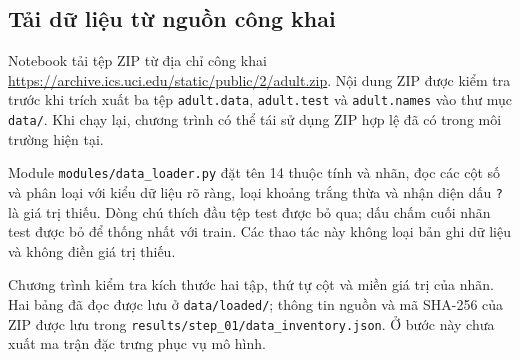 \subsection{Tải dữ liệu từ nguồn công khai}
\label{subsec:4_2_1}
Notebook tải tệp ZIP từ địa chỉ công khai \url{https://archive.ics.uci.edu/static/public/2/adult.zip}. Nội dung ZIP được kiểm tra trước khi trích xuất ba tệp \texttt{adult.data}, \texttt{adult.test} và \texttt{adult.names} vào thư mục \texttt{data/}. Khi chạy lại, chương trình có thể tái sử dụng ZIP hợp lệ đã có trong môi trường hiện tại.

Module \texttt{modules/data\_loader.py} đặt tên 14 thuộc tính và nhãn, đọc các cột số và phân loại với kiểu dữ liệu rõ ràng, loại khoảng trắng thừa và nhận diện dấu \texttt{?} là giá trị thiếu. Dòng chú thích đầu tệp test được bỏ qua; dấu chấm cuối nhãn test được bỏ để thống nhất với train. Các thao tác này không loại bản ghi dữ liệu và không điền giá trị thiếu.

Chương trình kiểm tra kích thước hai tập, thứ tự cột và miền giá trị của nhãn. Hai bảng đã đọc được lưu ở \texttt{data/loaded/}; thông tin nguồn và mã SHA-256 của ZIP được lưu trong \texttt{results/step\_01/data\_inventory.json}. Ở bước này chưa xuất ma trận đặc trưng phục vụ mô hình.

